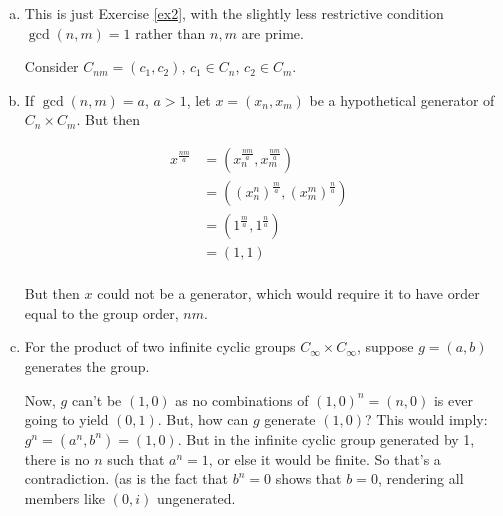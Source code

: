 \documentclass[11pt,oneside]{article}
\numberwithin{equation}{section}
\theoremstyle{definition}
\newtheorem{exercise}{Exercise}
\begin{document}
\begin{solution}
  \begin{enumerate}[(a)]
  \item
    This is just Exercise \ref{ex2}, with the slightly less
    restrictive condition $\gcd(n, m) = 1$ rather than $n, m$ are prime.

    Consider $C_{nm} = (c_1, c_2)$, $c_1 \in
    C_n$, $c_2 \in C_m$.

  \item
    If $\gcd(n, m) = a$, $a>1$, let $x = (x_n, x_m)$ be a hypothetical
    generator of $C_n \times C_m$.  But then

    \begin{align*}
      x ^ {\frac{nm}{a}} & = (x_n ^ {\frac{nm}{a}}, x_m ^{\frac{nm}{a}}) & \\
      & = ((x_n ^ n) ^ {\frac{m}{a}}, (x_m ^m)^{\frac{n}{a}}) & \\
      & = (1 ^ {\frac{m}{a}}, 1 ^ {\frac{n}{a}}) & \\
      & = (1, 1) \\
    \end{align*}
    
    But then $x$ could not be a generator, which would require it to have
    order equal to the group order, $nm$.
  \item
    For the product of two infinite cyclic groups $C_\infty \times C_\infty$,
    suppose $ g = (a, b)$ generates the group.

    Now, $g$ can't be $(1,0)$ as no combinations of $(1,0) ^n = (n,
    0)$ is ever going to yield $(0,1)$.  But, how can $g$ generate
    $(1,0)$? This would imply: $g ^ n = (a ^ n, b^n) = (1, 0)$.  But
    in the infinite cyclic group generated by 1, there is no $n$ such
    that $a ^n = 1 $, or else it would be finite.  So that's a
    contradiction.  (as is the fact that $b^n =0$ shows that $b = 0$,
    rendering all members like $(0, i)$ ungenerated.  
  \end{enumerate}
\end{solution}


\begin{comment}
  \begin{exercise}
    problem
  \end{exercise}
  \begin{solution}
    \begin{enumerate}[(a)]
    \item
      first answer
    \end{enumerate}
  \end{solution}
\end{comment}
\end{document}
